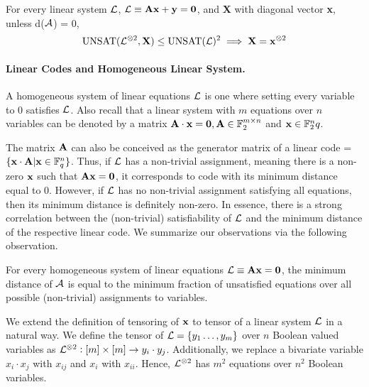 {\begin{corollary}
For every linear system ${\cal L}$, ${\cal L} \equiv {\bf Ax} + {\bf y} = {\bf 0}$, and {\bf X} with diagonal vector {\bf x}, unless d(${\cal A}$) = 0,
\[
 \mbox{UNSAT}({\cal L}^{\otimes 2}, {\bf X})  \le  \mbox{UNSAT}({\cal L})^2    \implies {\bf X} = {\bf x}^{\otimes 2} 
\]
\end{corollary}


\paragraph{Linear Codes and Homogeneous Linear System.}

A homogeneous system of linear equations ${\cal L}$ is one where setting
every variable to $0$ satisfies ${\cal L}$. Also recall that a linear
system with $m$ equations over $n$ variables can be denoted by a
matrix ${\bf A \cdot x } = {\bf 0}, {\bf A} \in \mathbb{F}_2^{m\times
  n}$ and ${\bf x} \in {\mathbb F}^n_2q$.

The matrix ${\bf A}$ can also be conceived as the generator matrix of
a linear code \A = $\{ {\bf x \cdot A} | {\bf x} \in
\mathbb{F}^n_q\}$.  Thus, if ${\cal L}$ has a non-trivial assignment,
meaning there is a non-zero ${\bf x}$ such that ${\bf Ax} = {\bf 0}$,
it corresponds to code with its minimum distance equal to
$0$. However, if ${\cal L}$ has no non-trivial assignment satisfying all
equations, then its minimum distance is definitely non-zero. In
essence, there is a strong correlation between the (non-trivial)
satisfiability of ${\cal L}$ and the minimum distance of the respective
linear code. We summarize our observations via the following
observation.

\begin{observation}
For every homogeneous system of linear equations ${\cal L} \equiv {\bf Ax = 0}$,
the minimum distance of ${\cal A}$ is equal to the minimum fraction of 
unsatisfied equations over all possible (non-trivial) assignments
to variables.
\end{observation}

We extend the definition of tensoring of ${\bf x}$ to tensor of a
linear system ${\cal L}$ in a natural way. We define the tensor of ${\cal L} =
\{y_1 \ldots, y_m\}$ over $n$ Boolean valued variables as
${\cal L}^{\otimes 2} : [m] \times [m] \rightarrow y_i \cdot
y_j$. Additionally, we replace a bivariate variable $x_i \cdot x_j$
with $x_{ij}$ and $x_i$ with $x_{ii}$. Hence, ${\cal L}^{\otimes 2}$ has
$m^2$ equations over $n^2$ Boolean variables.  


}
